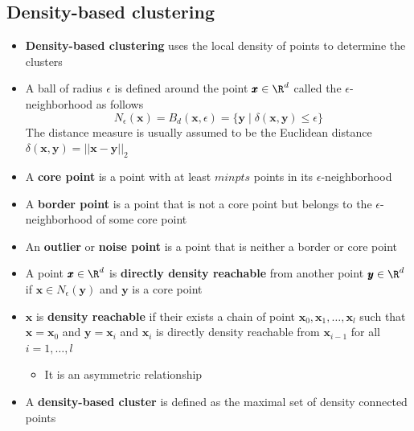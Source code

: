 \documentclass[a4, english]{article}
\begin{document}
\subsection{Density-based clustering}
\begin{itemize}
	\item \textbf{Density-based clustering} uses the local density of points to determine the clusters
  \item A ball of radius $\epsilon$ is defined around the point $\pmb x \in \R^d$ called the $\epsilon$-neighborhood as follows
  \begin{equation*}
    N_\epsilon (\pmb x) = B_d(\pmb x, \epsilon) = \{ \pmb y \mid \delta(\pmb x, \pmb y) \leq \epsilon \}
  \end{equation*}
  The distance measure is usually assumed to be the Euclidean distance $\delta(\pmb x, \pmb y) = ||\pmb x- \pmb y ||_2$
  \item A \textbf{core point} is a point with at least $minpts$ points in its $\epsilon$-neighborhood 
  \item A \textbf{border point} is a point that is not a core point but belongs to the $\epsilon$-neighborhood of some core point  
  \item An \textbf{outlier} or \textbf{noise point} is a point that is neither a border or core point 
  \item A point $\pmb x \in \R^d$ is \textbf{directly density reachable} from another point $\pmb y \in \R^d$ if $\pmb x \in N_\epsilon(\pmb y)$ and $\pmb y$ is a core point
	\item $\pmb x$ is \textbf{density reachable} if their exists a chain of point $\pmb x_0, \pmb x_1, \dots, \pmb x_l$ such that $\pmb x = \pmb x_0$ and $\pmb y = \pmb x_i$ and $\pmb x_i$ is directly density reachable from $\pmb x_{i-1}$ for all $i=1, \dots,l$
  \begin{itemize}
  	\item It is an asymmetric relationship
  \end{itemize}
	\item A \textbf{density-based cluster} is defined as the maximal set of density connected points 
\end{itemize}
\end{document}
